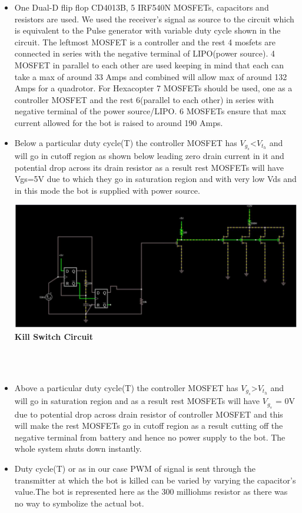\documentclass[12pt]{article}
\begin{document}
\begin{itemize}
\item One Dual-D flip flop CD4013B, 5 IRF540N MOSFETs, capacitors and resistors are used. We used the receiver’s signal as source to the circuit which is equivalent to the Pulse generator with variable duty cycle shown in the circuit. The leftmost MOSFET is a controller and the rest 4  mosfets  are connected in series with the negative terminal of LIPO(power source). 4 MOSFET in parallel to each other are used  keeping in mind that each can take a max of around 33 Amps and combined will allow max of around 132 Amps for a quadrotor. For Hexacopter 7 MOSFETs should be used, one as a controller MOSFET and the rest 6(parallel to each other) in series with negative terminal of the power source/LIPO. 6 MOSFETs ensure that max current allowed for the bot is raised to around 190 Amps.  
\item Below a particular duty cycle(T) the controller MOSFET has $V_g_s$<$V_t_h$ and will go in cutoff region as shown below leading zero drain current in it and potential drop across its drain resistor as a result rest MOSFETs will have Vgs=5V due to which they go in saturation region and with very low Vds and in this mode the bot is supplied with power source.\\
\begin{center}
\includegraphics[scale = 0.4]{kill} \\
\textbf{Kill Switch Circuit}\\ \\
\end{center}
\\
\item Above a particular duty cycle(T) the controller MOSFET has $V_g_s$>$V_t_h$ and will go in saturation region and as a result rest MOSFETs will have $V_g_s$ = 0V due to potential drop across drain resistor of controller MOSFET and this will make the rest MOSFETs go in cutoff region as a result cutting off the negative terminal from battery and hence no power supply to the bot. The whole system shuts down instantly.
\item Duty cycle(T) or as in our case PWM of signal  is sent through the transmitter at which the bot is killed can be varied by varying the capacitor’s value.The bot is represented here as the 300 milliohms resistor as there was no way to symbolize the actual bot.
\end{itemize}
\end{document}
